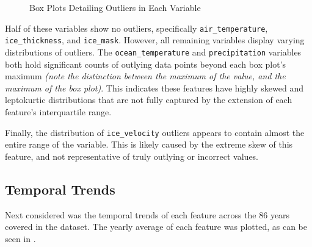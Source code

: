 \begin{figure}[H]
  \centering
  \caption{Box Plots Detailing Outliers in Each Variable}
  \label{fig:boxplots}
\end{figure}

Half of these variables show no outliers, specifically \texttt{air\_temperature}, \texttt{ice\_thickness}, and \texttt{ice\_mask}. However, all remaining variables display varying distributions of outliers. The \texttt{ocean\_temperature} and \texttt{precipitation} variables both hold significant counts of outlying data points beyond each box plot's maximum \textit{(note the distinction between the maximum of the value, and the maximum of the box plot)}. This indicates these features have highly skewed and leptokurtic distributions that are not fully captured by the extension of each feature's interquartile range.

Finally, the distribution of \texttt{ice\_velocity} outliers appears to contain almost the entire range of the variable. This is likely caused by the extreme skew of this feature, and not representative of truly outlying or incorrect values.

\subsection{Temporal Trends}\label{SS:temporal_trends}

Next considered was the temporal trends of each feature across the 86 years covered in the dataset. The yearly average of each feature was plotted, as can be seen in .

